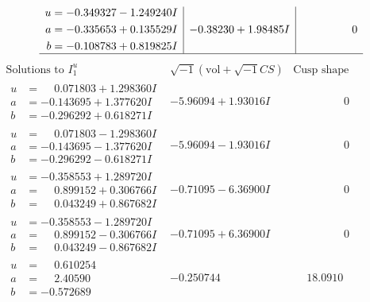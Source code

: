 \documentclass[1p]{elsarticle_modified}
\theoremstyle{definition}
\newcommand{\I}{\sqrt{-1}}
\begin{document}
$$\begin{array}{c|c|c}
\begin{aligned}
u &= -0.349327 - 1.249240 I \\
a &= -0.335653 + 0.135529 I \\
b &= -0.108783 + 0.819825 I\end{aligned}
 & -0.38230 + 1.98485 I & \phantom{-0.000000 } 0\\
 \hline 
 \end{array}$$\newpage$$\begin{array}{c|c|c}  
\text{Solutions to }I^u_{1}& \I (\text{vol} + \sqrt{-1}CS) & \text{Cusp shape}\\
 \hline 
\begin{aligned}
u &= \phantom{-}0.071803 + 1.298360 I \\
a &= -0.143695 + 1.377620 I \\
b &= -0.296292 + 0.618271 I\end{aligned}
 & -5.96094 + 1.93016 I & \phantom{-0.000000 } 0 \\ \hline\begin{aligned}
u &= \phantom{-}0.071803 - 1.298360 I \\
a &= -0.143695 - 1.377620 I \\
b &= -0.296292 - 0.618271 I\end{aligned}
 & -5.96094 - 1.93016 I & \phantom{-0.000000 } 0 \\ \hline\begin{aligned}
u &= -0.358553 + 1.289720 I \\
a &= \phantom{-}0.899152 + 0.306766 I \\
b &= \phantom{-}0.043249 + 0.867682 I\end{aligned}
 & -0.71095 - 6.36900 I & \phantom{-0.000000 } 0 \\ \hline\begin{aligned}
u &= -0.358553 - 1.289720 I \\
a &= \phantom{-}0.899152 - 0.306766 I \\
b &= \phantom{-}0.043249 - 0.867682 I\end{aligned}
 & -0.71095 + 6.36900 I & \phantom{-0.000000 } 0 \\ \hline\begin{aligned}
u &= \phantom{-}0.610254\phantom{ +0.000000I} \\
a &= \phantom{-}2.40590\phantom{ +0.000000I} \\
b &= -0.572689\phantom{ +0.000000I}\end{aligned}
 & -0.250744\phantom{ +0.000000I} & \phantom{-}18.0910\phantom{ +0.000000I} \\ \hline\begin{aligned}

\end{aligned}
\end{array}$$
\end{document}
